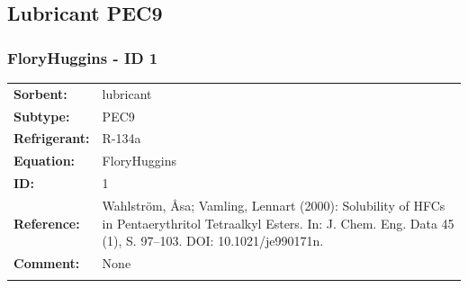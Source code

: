 \subsection{Lubricant PEC9}
%
\subsubsection{FloryHuggins - ID 1}
%
\begin{tabular}[l]{|lp{11.5cm}|}
\hline
\addlinespace

\textbf{Sorbent:} & lubricant \\
\textbf{Subtype:} & PEC9 \\
\textbf{Refrigerant:} & R-134a \\
\textbf{Equation:} & FloryHuggins \\
\textbf{ID:} & 1 \\
\textbf{Reference:} & Wahlström, Åsa; Vamling, Lennart (2000): Solubility of HFCs in Pentaerythritol Tetraalkyl Esters. In: J. Chem. Eng. Data 45 (1), S. 97–103. DOI: 10.1021/je990171n. \\
\textbf{Comment:} & None \\

\addlinespace
\hline
\end{tabular}
\newline

